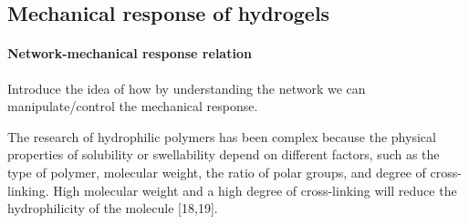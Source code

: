 \subsection{Mechanical response of hydrogels}\label{ch1:Cross-linking}

\paragraph{Network-mechanical response relation} Introduce the idea of how by understanding the network we can manipulate/control the mechanical response.

The research of hydrophilic polymers has been complex because the physical properties of solubility or swellability depend on different factors, such as the type of polymer, molecular weight, the ratio of polar groups, and degree of cross-linking\citep{bustamante-torresHydrogelsClassificationAccording2021}.
High molecular weight and a high degree of cross-linking will reduce the hydrophilicity of the molecule [18,19]\citep{bustamante-torresHydrogelsClassificationAccording2021}. 


